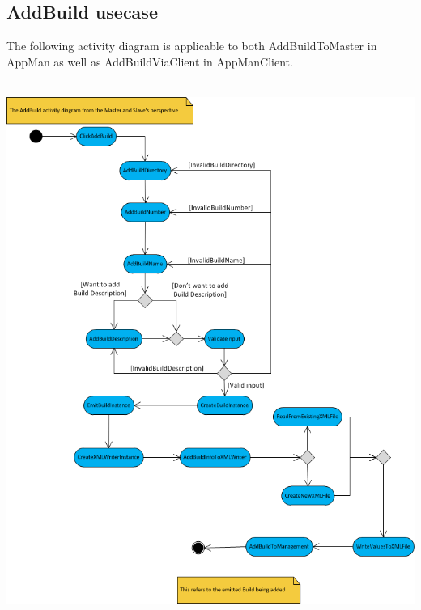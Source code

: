 \documentclass[a4paper,12pt,final]{article}
\begin{document}
\subsection{AddBuild usecase}
The following activity diagram is applicable to both AddBuildToMaster in AppMan as well as AddBuildViaClient in AppManClient.\\
\textbf{\\}
\begin{center}
\includegraphics[scale=0.8]{AddBuildActivity.png}
\end{center}
\end{document}
